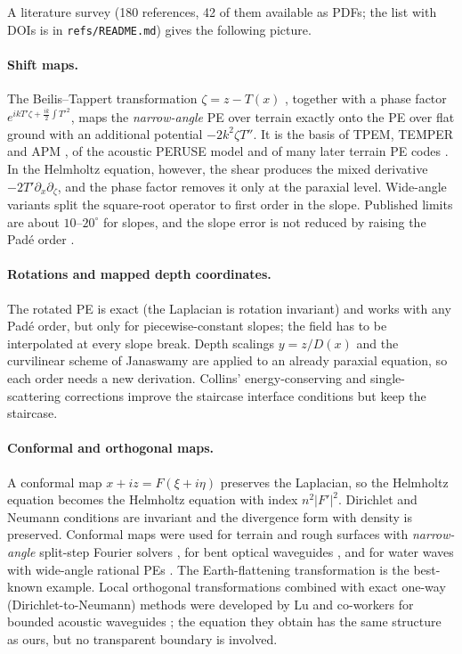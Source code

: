 \documentclass[11pt,a4paper]{article}
\theoremstyle{remark}
\newcommand{\pd}{\partial}
\begin{document}
A literature survey (180 references, 42 of them available as PDFs; the list
with DOIs is in \texttt{refs/README.md}) gives the following picture.

\paragraph{Shift maps.}
The Beilis--Tappert transformation $\zeta=z-T(x)$ \cite{beilis1979coupled},
together with a phase factor $e^{ikT'\zeta+\frac{ik}{2}\int T'^2}$, maps the
\emph{narrow-angle} PE over terrain exactly onto the PE over flat ground with an
additional potential $-2k^2\zeta T''$. It is the basis of TPEM, TEMPER and APM
\cite{barrios1994tpem,donohue2000gtpe,barrios2003apm}, of the acoustic
PERUSE model \cite{dozier1984peruse} and of many later terrain PE codes
\cite{parakkal2012beilis,khodr2020iterative,wang2020smpe}. In the Helmholtz
equation, however, the shear produces the mixed derivative $-2T'\pd_x\pd_\zeta$,
and the phase factor removes it only at the paraxial level. Wide-angle variants
\cite{donohue2000gtpe} split the square-root operator to first order in the
slope. Published limits are about $10$--$20^\circ$ for slopes, and the slope
error is not reduced by raising the Pad\'e order \cite{wang2020smpe}.

\paragraph{Rotations and mapped depth coordinates.}
The rotated PE \cite{collins1990rotated,outing2006variable} is exact (the Laplacian
is rotation invariant) and works with any Pad\'e order, but only for
piecewise-constant slopes; the field has to be interpolated at every slope
break. Depth scalings $y=z/D(x)$
\cite{abrahamsson1990bc,akrivis1994galerkin,collins2000mapping,metzler2014scaled}
and the curvilinear scheme of Janaswamy \cite{janaswamy1998curvilinear} are
applied to an already paraxial equation, so each order needs a new derivation.
Collins' energy-conserving \cite{collins1991energy} and single-scattering
corrections improve the staircase interface conditions but keep the staircase.

\paragraph{Conformal and orthogonal maps.}
A conformal map $x+iz=F(\xi+i\eta)$ preserves the Laplacian, so the Helmholtz
equation becomes the Helmholtz equation with index $n^2|F'|^2$. Dirichlet and
Neumann conditions are invariant and the divergence form with density is
preserved. Conformal maps were used for terrain and rough surfaces with
\emph{narrow-angle} split-step Fourier solvers
\cite{dozier1984peruse,donohue1997apl}, for bent optical waveguides
\cite{heiblum1975conformal}, and for water waves with wide-angle rational PEs
\cite{kirby1994conformal}. The Earth-flattening transformation is the
best-known example. Local orthogonal transformations combined with exact one-way
(Dirichlet-to-Neumann) methods were developed by Lu and co-workers for bounded
acoustic waveguides \cite{lu1999exact,lu2001lot,lu2004lot}; the equation they
obtain has the same structure as ours, but no transparent boundary is involved.
\end{document}
